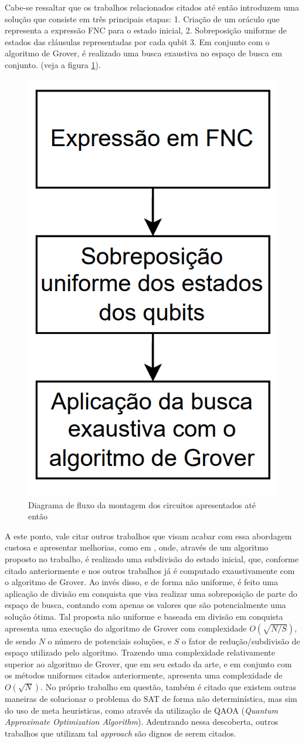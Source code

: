 \documentclass[12pt]{article}
\begin{document}
Cabe-se ressaltar que os trabalhos relacionados citados até então introduzem uma solução que consiste em três principais etapas: 1. Criação de um oráculo que representa a expressão FNC para o estado inicial, 2. Sobreposição uniforme de estados das cláusulas representadas por cada qubit 3. Em conjunto com o algoritmo de Grover, é realizado uma busca exaustiva no espaço de busca em conjunto. (veja a figura \ref{fig:diagrama_fluxo_trabalhos_relacionados}). 

\begin{figure}[h]
    \centering
    \includegraphics[width=0.18\linewidth]{diagrama_fluxo_convencional_trabalhos_relacionados.png}
        \caption{Diagrama de fluxo da montagem dos circuitos apresentados até então}
        \label{fig:diagrama_fluxo_trabalhos_relacionados}
\end{figure}
A este ponto, vale citar outros trabalhos que visam acabar com essa abordagem custosa e apresentar melhorias, como em \cite{varmantchaonala:23}, onde, através de um algoritmo proposto no trabalho, é realizado uma subdivisão do estado inicial, que, conforme citado anteriormente e nos outros trabalhos já é computado exaustivamente com o algoritmo de Grover. Ao invés disso, e de forma não uniforme, é feito uma aplicação de divisão em conquista que visa realizar uma sobreposição de parte do espaço de busca, contando com apenas os valores que são potencialmente uma solução ótima. Tal proposta não uniforme e baseada em divisão em conquista apresenta uma execução do algoritmo de Grover com complexidade
$O \left( \sqrt{{N/S}} \right)$, de sendo $N$ o número de potenciais soluções, e $S$ o fator de redução/subdivisão de espaço utilizado pelo algoritmo. Trazendo uma complexidade relativamente superior ao algoritmo de Grover, que em seu estado da arte, e em conjunto com os métodos uniformes citados anteriormente, apresenta uma complexidade de $O \left( \sqrt{N} \right)$. No próprio trabalho em questão, também é citado que existem outras maneiras de solucionar o problema do SAT de forma não determinística, mas sim do uso de meta heuristicas, como através da utilização de QAOA (\textit{Quantum Approximate Optimization Algorithm}). Adentrando nessa descoberta, outros trabalhos que utilizam tal \textit{approach} são dignos de serem citados.
\end{document}
